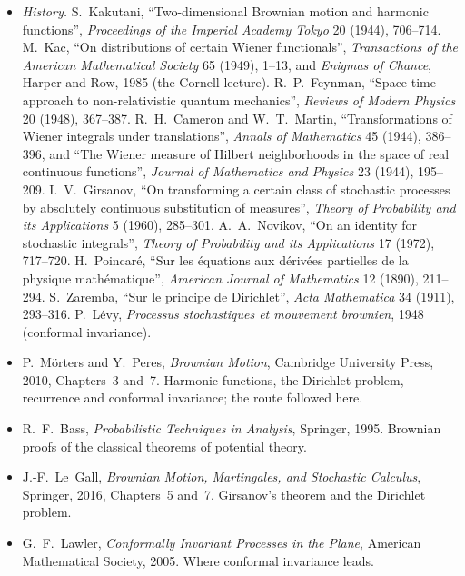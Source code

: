 \begin{itemize}
\item \emph{History.} S.~Kakutani, ``Two-dimensional Brownian motion and harmonic functions'', \emph{Proceedings of the Imperial Academy Tokyo} 20 (1944), 706--714. M.~Kac, ``On distributions of certain Wiener
functionals'', \emph{Transactions of the American Mathematical Society} 65 (1949), 1--13, and \emph{Enigmas of Chance}, Harper and Row, 1985 (the Cornell lecture). R.~P.~Feynman, ``Space-time approach to
non-relativistic quantum mechanics'', \emph{Reviews of Modern Physics} 20 (1948), 367--387. R.~H.~Cameron and W.~T.~Martin, ``Transformations of Wiener integrals under translations'', \emph{Annals of Mathematics}
45 (1944), 386--396, and ``The Wiener measure of Hilbert neighborhoods in the space of real continuous functions'', \emph{Journal of Mathematics and Physics} 23 (1944), 195--209. I.~V.~Girsanov, ``On transforming a
certain class of stochastic processes by absolutely continuous substitution of measures'', \emph{Theory of Probability and its Applications} 5 (1960), 285--301. A.~A.~Novikov, ``On an identity for stochastic integrals'',
\emph{Theory of Probability and its Applications} 17 (1972), 717--720. H.~Poincar\'e, ``Sur les \'equations aux d\'eriv\'ees partielles de la physique math\'ematique'', \emph{American Journal of Mathematics} 12 (1890),
211--294. S.~Zaremba, ``Sur le principe de Dirichlet'', \emph{Acta Mathematica} 34 (1911), 293--316. P.~L\'evy, \emph{Processus stochastiques et mouvement brownien}, 1948 (conformal invariance).
\item P.~M\"orters and Y.~Peres, \emph{Brownian Motion}, Cambridge University Press, 2010, Chapters~3 and~7. Harmonic functions, the Dirichlet problem, recurrence and conformal invariance; the route followed here.
\item R.~F.~Bass, \emph{Probabilistic Techniques in Analysis}, Springer, 1995. Brownian proofs of the classical theorems of potential theory.
\item J.-F.~Le~Gall, \emph{Brownian Motion, Martingales, and Stochastic Calculus}, Springer, 2016, Chapters~5 and~7. Girsanov's theorem and the Dirichlet problem.
\item G.~F.~Lawler, \emph{Conformally Invariant Processes in the Plane}, American Mathematical Society, 2005. Where conformal invariance leads.
\end{itemize}
